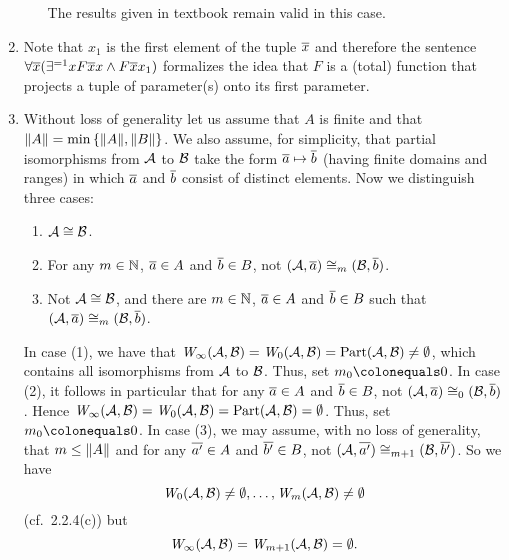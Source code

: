 \begin{enumerate}[1.]
\begin{enumerate}[(1)]
\begin{remark}
The results given in textbook remain valid in this case.
\end{remark}
\end{enumerate}
%
\item {} Note that $x_1$ is the first element of the tuple $\overline{x}$ and therefore the sentence $\forall \overline{x} (\exists^{= 1}x F\overline{x}x \land F\overline{x}x_1)$ formalizes the idea that $F$ is a (total) function that projects a tuple of parameter(s) onto its first parameter.
%
\item {} Without loss of generality let us assume that $A$ is finite and that $\|A\| = \min{\{\|A\|, \|B\|\}}$. We also assume, for simplicity, that partial isomorphisms from $\mathcal{A}$ to $\mathcal{B}$ take the form $\overline{a} \mapsto \overline{b}$ (having finite domains and ranges) in which $\overline{a}$ and $\overline{b}$ consist of distinct elements.
\newpar
Now we distinguish three cases:
\begin{enumerate}[(1)]
\item $\mathcal{A} \cong \mathcal{B}$.
\item For any $m \in \mathbb{N}$, $\overline{a} \in A$ and $\overline{b} \in B$, not $(\mathcal{A}, \overline{a}) \cong_m (\mathcal{B}, \overline{b})$.
\item Not $\mathcal{A} \cong \mathcal{B}$, and there are $m \in \mathbb{N}$, $\overline{a} \in A$ and $\overline{b} \in B$ such that $(\mathcal{A}, \overline{a}) \cong_m (\mathcal{B}, \overline{b})$.
\end{enumerate}
In case (1), we have that $\winpos{\infty}(\strct{A}, \strct{B}) = \winpos{0}(\strct{A}, \strct{B}) = \partisoms(\strct{A}, \strct{B}) \neq \emptyset$, which contains all isomorphisms from $\mathcal{A}$ to $\mathcal{B}$. Thus, set $m_0 \defas 0$.
\newpar
In case (2), it follows in particular that for any $\overline{a} \in A$ and $\overline{b} \in B$, not $(\mathcal{A}, \overline{a}) \cong_0 (\mathcal{B}, \overline{b})$. Hence $\winpos{\infty}(\strct{A}, \strct{B}) = \winpos{0}(\strct{A}, \strct{B}) = \partisoms(\strct{A}, \strct{B}) = \emptyset$. Thus, set $m_0 \defas 0$.
\newpar
In case (3), we may assume, with no loss of generality, that $m \leq \|A\|$ and for any $\overline{a'} \in A$ and $\overline{b'} \in B$, not $(\mathcal{A}, \overline{a'}) \cong_{m + 1} (\mathcal{B}, \overline{b'})$. So we have
\[
\winpos{0}(\strct{A}, \strct{B}) \neq \emptyset, \etc, \winpos{m}(\strct{A}, \strct{B}) \neq \emptyset
\]
(cf.\ 2.2.4(c)) but
\[
\winpos{\infty}(\strct{A}, \strct{B}) = \winpos{m + 1}(\strct{A}, \strct{B}) = \emptyset.
\]
\end{enumerate}
